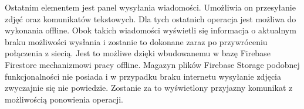 Ostatnim elementem jest panel wysyłania wiadomości. Umożliwia on przesyłanie zdjęć oraz komunikatów tekstowych. Dla tych ostatnich operacja jest możliwa do wykonania offline. Obok takich wiadomości wyświetli się informacja o aktualnym braku możliwości wysłania i zostanie to dokonane zaraz po przywróceniu połączenia z siecią. Jest to możliwe dzięki wbudowanemu w bazę Firebase Firestore mechanizmowi pracy offline. Magazyn plików Firebase Storage podobnej funkcjonalności nie posiada i w przypadku braku internetu wysyłanie zdjęcia zwyczajnie się nie powiedzie. Zostanie za to wyświetlony przyjazny komunikat z możliwością ponowienia operacji.